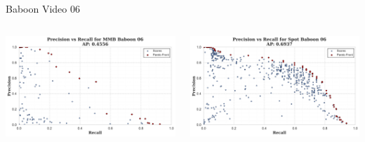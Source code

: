 \begin{frame}{Baboon Video 06}
    \begin{columns}
        \begin{column}{0.48\textwidth}
            \centering
            \includegraphics[width=\textwidth,height=0.7\textheight,keepaspectratio]{images/bom/precision_recall_MMB_Baboon_06.png}
        \end{column}
        \begin{column}{0.48\textwidth}
            \centering
            \includegraphics[width=\textwidth,height=0.7\textheight,keepaspectratio]{images/bom/precision_recall_Spot_Baboon_06.png}
        \end{column}
    \end{columns}
\end{frame}
